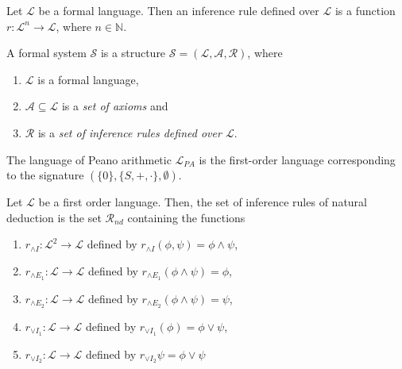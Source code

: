 \begin{definition}
    Let $\mathcal{L}$ be a formal language. Then an inference rule defined over $\mathcal{L}$ is a function $r : \mathcal{L}^n \to \mathcal{L}$, where $n \in \mathbb{N}$.
\end{definition}

\begin{definition}
    A formal system $\mathcal{S}$ is a structure $\mathcal{S} = (\mathcal{L}, \mathcal{A}, \mathcal{R})$, where 
    \begin{enumerate}
        \item $\mathcal{L}$ is a formal language,
        \item $\mathcal{A} \subseteq \mathcal{L}$ is a \textit{set of axioms} and 
        \item $\mathcal{R}$ is a \textit{set of inference rules defined over $\mathcal{L}$}.
    \end{enumerate}
\end{definition}

\begin{definition}
    The language of Peano arithmetic $\mathcal{L}_{PA}$ is the first-order language corresponding to the signature $(\{0\},\{S,+,\cdot\},\emptyset)$.
\end{definition}

\begin{definition}
    Let $\mathcal{L}$ be a first order language. Then, the set of inference rules of natural deduction is the set $\mathcal{R}_{nd}$ containing the functions 
    \begin{enumerate}
        \item $r_{\land I} : \mathcal{L}^2 \to \mathcal{L}$ defined by $r_{\land I}(\phi,\psi) = \phi \land \psi$,
        \item $r_{\land E_1} : \mathcal{L} \to \mathcal{L}$ defined by $r_{\land E_1}(\phi \land \psi) = \phi$,
        \item $r_{\land E_2} : \mathcal{L} \to \mathcal{L}$ defined by $r_{\land E_2}(\phi \land \psi) = \psi$,
        \item $r_{\lor I_1} : \mathcal{L} \to \mathcal{L}$ defined by $r_{\lor I_1}(\phi) = \phi \lor \psi$,
        \item $r_{\lor I_2} : \mathcal{L} \to \mathcal{L}$ defined by $r_{\lor I_2}{\psi} = \phi \lor \psi$
    \end{enumerate}
\end{definition}

